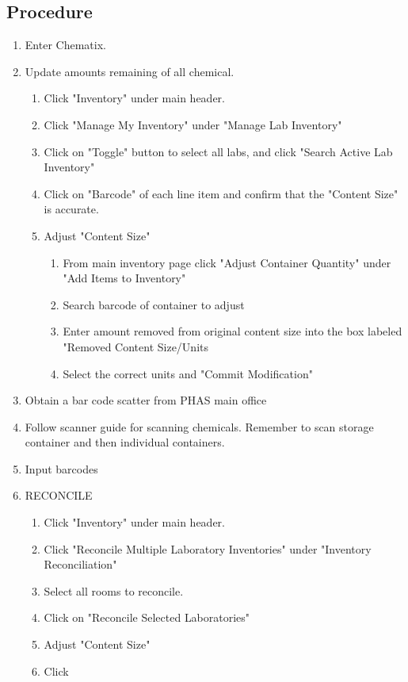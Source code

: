 \documentclass[justified]{tufte-book}
\begin{document}
\subsection{Procedure}
\begin{enumerate}
	\item Enter Chematix.
	\item Update amounts remaining of  all chemical.
	\begin{enumerate}
		\item Click "Inventory" under main header.
		\item Click "Manage My Inventory" under "Manage Lab Inventory"
		\item Click on "Toggle" button to select all labs, and click "Search Active Lab 				Inventory"
		\item Click on "Barcode" of each line item and confirm that the "Content Size" is 			accurate.
		\item Adjust "Content Size"
		\begin{enumerate}
			\item From main inventory page click "Adjust Container Quantity" under "Add Items 			to Inventory"
			\item Search barcode of container to adjust
			\item Enter amount removed from original content size into the box labeled 					"Removed	 Content Size/Units
			\item Select the correct units and "Commit Modification"
		\end{enumerate}
	\end{enumerate}
	\item Obtain a bar code scatter from PHAS main office
	\item Follow scanner guide for scanning chemicals. Remember to scan storage container and 	then individual containers.
	\item Input barcodes
	\item RECONCILE
	\begin{enumerate}
		\item Click "Inventory" under main header.
		\item Click "Reconcile Multiple Laboratory Inventories" under "Inventory Reconciliation"
		\item Select all rooms to reconcile.
		\item Click on "Reconcile Selected Laboratories"
		\item Adjust "Content Size"
		\item Click 
	\end{enumerate}
\end{enumerate}
\end{document}
